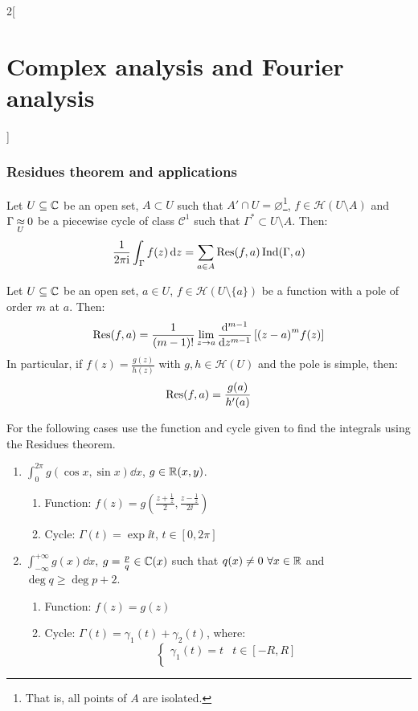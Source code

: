 \documentclass[../../../main.tex]{subfiles}
\begin{document}
\begin{multicols}{2}[\section{Complex analysis and Fourier analysis}]
  \subsubsection{Residues theorem and applications}
  \begin{theorem}
    Let $U\subseteq \CC$ be an open set, $A\subset U$ such that $A'\cap U=\varnothing$\footnote{That is, all points of $A$ are isolated.}, $f\in\mathcal{H}(U\setminus A)$ and $\Gamma\homoleg{U} 0$ be a piecewise cycle of class $\mathcal{C}^1$ such that $\Gamma^*\subset U\setminus A$. Then:
    $$\frac{1}{2\pi\ii}\int_{\Gamma}f(z)\dd{z}=\sum_{a\in A}\Res(f,a)\Ind(\Gamma,a)$$
  \end{theorem}
  \begin{proposition}
    Let $U\subseteq \CC$ be an open set, $a\in U$, $f\in\mathcal{H}(U\setminus\{a\})$ be a function with a pole of order $m$ at $a$. Then: $$\Res(f,a)=\frac{1}{(m-1)!}\lim_{z\to a}\dv[m-1]{}{z}\left[{(z-a)}^mf(z)\right]$$
    In particular, if $f(z)=\frac{g(z)}{h(z)}$ with $g,h\in\mathcal{H}(U)$ and the pole is simple, then: $$\Res(f,a)=\frac{g(a)}{h'(a)}$$
  \end{proposition}
  \begin{method}
    For the following cases use the function and cycle given to find the integrals using the Residues theorem.
    \begin{enumerate}
      \item $\displaystyle\int_0^{2\pi} g(\cos x,\sin x)\dd{x}$, $g\in\RR(x,y)$.
            \begin{enumerate}
              \item Function: $f(z)=g\left(\frac{z+\frac{1}{z}}{2},\frac{z-\frac{1}{z}}{2\ii}\right)$
              \item Cycle: $\Gamma(t)=\exp{\ii t}$, $t\in[0,2\pi]$
            \end{enumerate}
      \item $\displaystyle\int_{-\infty}^{+\infty} g(x)\dd{x}$, $g=\frac{p}{q}\in\CC(x)$ such that $q(x)\ne 0\ \forall x\in \RR$ and $\deg q\geq \deg p+2$.
            \begin{enumerate}
              \item Function: $f(z)=g(z)$
              \item Cycle: $\Gamma(t)=\gamma_1(t)+\gamma_2(t)$, where:
                    $$
                      \begin{cases}
                        \gamma_1(t)=t            & t\in[-R,R]  \\

\end{cases}$$
\end{enumerate}
\end{enumerate}
\end{method}
\end{multicols}
\end{document}
